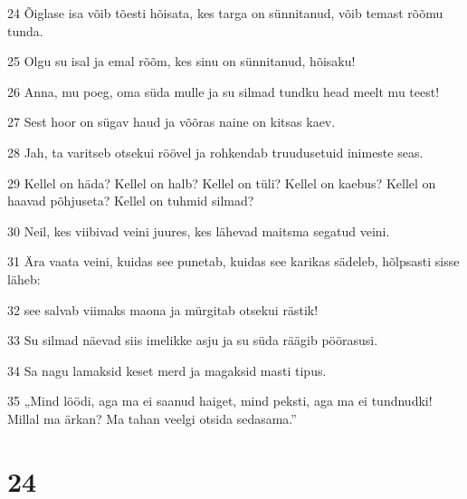 \par 24 Õiglase isa võib tõesti hõisata, kes targa on sünnitanud, võib temast rõõmu tunda.
\par 25 Olgu su isal ja emal rõõm, kes sinu on sünnitanud, hõisaku!
\par 26 Anna, mu poeg, oma süda mulle ja su silmad tundku head meelt mu teest!
\par 27 Sest hoor on sügav haud ja võõras naine on kitsas kaev.
\par 28 Jah, ta varitseb otsekui röövel ja rohkendab truudusetuid inimeste seas.
\par 29 Kellel on häda? Kellel on halb? Kellel on tüli? Kellel on kaebus? Kellel on haavad põhjuseta? Kellel on tuhmid silmad?
\par 30 Neil, kes viibivad veini juures, kes lähevad maitsma segatud veini.
\par 31 Ära vaata veini, kuidas see punetab, kuidas see karikas sädeleb, hõlpsasti sisse läheb:
\par 32 see salvab viimaks maona ja mürgitab otsekui rästik!
\par 33 Su silmad näevad siis imelikke asju ja su süda räägib pöörasusi.
\par 34 Sa nagu lamaksid keset merd ja magaksid masti tipus.
\par 35 „Mind löödi, aga ma ei saanud haiget, mind peksti, aga ma ei tundnudki! Millal ma ärkan? Ma tahan veelgi otsida sedasama.”

\chapter{24}

